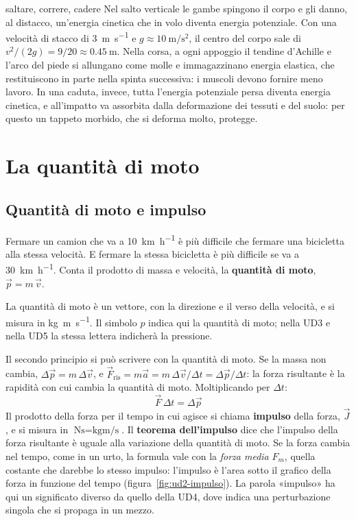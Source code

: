 \begin{applicazione}{saltare, correre, cadere}
Nel salto verticale le gambe spingono il corpo e gli danno, al distacco, un'energia cinetica che in volo diventa energia potenziale. Con una velocità di stacco di \SI{3}{\metre\per\second} e $g \approx \SI{10}{\metre\per\second\squared}$, il centro del corpo sale di $v^2/(2g) = 9/20 \approx \SI{0,45}{\metre}$. Nella corsa, a ogni appoggio il tendine d'Achille e l'arco del piede si allungano come molle e immagazzinano energia elastica, che restituiscono in parte nella spinta successiva: i muscoli devono fornire meno lavoro. In una caduta, invece, tutta l'energia potenziale persa diventa energia cinetica, e all'impatto va assorbita dalla deformazione dei tessuti e del suolo: per questo un tappeto morbido, che si deforma molto, protegge.
\end{applicazione}



\section{La quantità di moto}
\label{sec:ud2-quantita}

\subsection{Quantità di moto e impulso}

Fermare un camion che va a \SI{10}{\kilo\metre\per\hour} è più difficile che fermare una bicicletta alla stessa velocità. E fermare la stessa bicicletta è più difficile se va a \SI{30}{\kilo\metre\per\hour}. Conta il prodotto di massa e velocità, la \textbf{quantità di moto}, $\vec p = m\,\vec v$.

La quantità di moto è un vettore, con la direzione e il verso della velocità, e si misura in \si{\kilo\gram\metre\per\second}. Il simbolo $p$ indica qui la quantità di moto; nella UD3 e nella UD5 la stessa lettera indicherà la pressione.

Il secondo principio si può scrivere con la quantità di moto. Se la massa non cambia, $\Delta\vec p = m\,\Delta\vec v$, e $\vec F_{\text{ris}} = m\vec a = m\,\Delta\vec v/\Delta t = \Delta\vec p/\Delta t$: la forza risultante è la rapidità con cui cambia la quantità di moto. Moltiplicando per $\Delta t$:
\[
  \vec F\,\Delta t = \Delta\vec p
\]
Il prodotto della forza per il tempo in cui agisce si chiama \textbf{impulso} della forza, $\vec J$, e si misura in $\si{\newton\second} = \si{\kilo\gram\metre\per\second}$. Il \textbf{teorema dell'impulso} dice che l'impulso della forza risultante è uguale alla variazione della quantità di moto. Se la forza cambia nel tempo, come in un urto, la formula vale con la \emph{forza media} $F_m$, quella costante che darebbe lo stesso impulso: l'impulso è l'area sotto il grafico della forza in funzione del tempo (figura~\ref{fig:ud2-impulso}). La parola «impulso» ha qui un significato diverso da quello della UD4, dove indica una perturbazione singola che si propaga in un mezzo.

